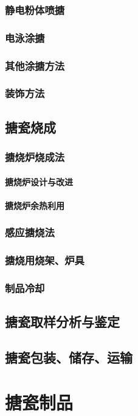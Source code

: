 \documentclass[UTF8]{../../ApplicationUniverse}
\begin{document}
        \subsubsection{静电粉体喷搪}
        \subsubsection{电泳涂搪}
        \subsubsection{其他涂搪方法}
        \subsubsection{装饰方法}
    \subsection{搪瓷烧成}
        \subsubsection{搪烧炉烧成法}
            \paragraph{搪烧炉设计与改进}
            \paragraph{搪烧炉余热利用}
        \subsubsection{感应搪烧法}
        \subsubsection{搪烧用烧架、炉具}
        \subsubsection{制品冷却}
    \subsection{搪瓷取样分析与鉴定}
    \subsection{搪瓷包装、储存、运输}
\section{搪瓷制品}
\end{document}
